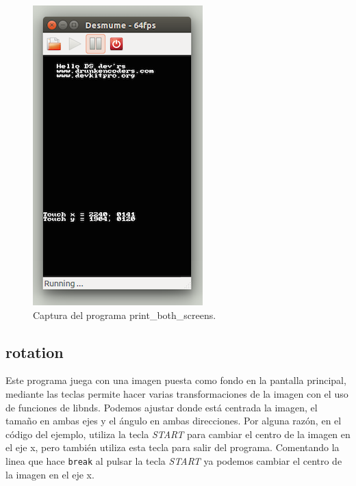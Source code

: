 \documentclass[12pt,english]{article}
\begin{document}
    \begin{figure}[H] 
    \centering
    \includegraphics[scale=0.5]{images/print_both_screens}
    \caption{Captura del programa print\_both\_screens.}
    \end{figure}

    \newpage

    \subsection{rotation}

    Este programa juega con una imagen puesta como fondo en la pantalla principal, mediante las teclas permite hacer varias transformaciones de la imagen con el uso de funciones de libnds. Podemos ajustar donde está centrada la imagen, el tamaño en ambas ejes y el ángulo en ambas direcciones. Por alguna razón, en el código del ejemplo, utiliza la tecla \emph{START} para cambiar el centro de la imagen en el eje x, pero también utiliza esta tecla para salir del programa. Comentando la linea que hace \texttt{break} al pulsar la tecla \emph{START} ya podemos cambiar el centro de la imagen en el eje x.
\end{document}
